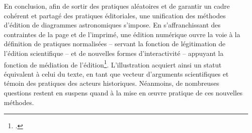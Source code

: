 En conclusion, afin de sortir des pratiques aléatoires et de garantir un
cadre cohérent et partagé des pratiques éditoriales, une
unification des méthodes d'édition de diagrammes astronomiques
s'impose. En s'affranchissant des contraintes de la page et de
l'imprimé, une édition numérique ouvre la voie à la définition de
pratiques normalisées -- servant la fonction de légitimation de l'édition scientifique -- et de nouvelles
formes d'interactivité -- appuyant la fonction de médiation de l'édition\footcite[Sur les trois fonctions de l'édition, voir][]{epron_ledition_2018}. L'illustration acquiert
ainsi un statut équivalent à celui du texte, en tant que vecteur
d'arguments scientifiques et témoin des pratiques des acteurs
historiques. Néanmoins, de nombreuses questions restent en suspens quand
à la mise en œuvre pratique de ces nouvelles méthodes.